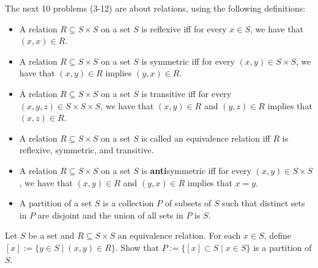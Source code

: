 \documentclass[12pt]{article}
\newenvironment{ex}[2][Problem]{\begin{trivlist}
\item[\hskip \labelsep {\bfseries #1}\hskip \labelsep {\bfseries #2.}]}{\end{trivlist}}
\begin{document}
The next 10 problems (3-12) are about relations, using the following definitions:
\begin{itemize}
    \item A relation $R\subseteq S\times S$ on a set $S$ is reflexive iff
        for every $x\in S$, we have that $(x,x)\in R$.
    \item A relation $R\subseteq S\times S$ on a set $S$ is symmetric iff
        for every $(x,y)\in S\times S$,
            we have that $(x,y)\in R$ implies $(y,x)\in R$.
    \item A relation $R\subseteq S\times S$ on a set $S$ is transitive iff
        for every $(x,y,z)\in S\times S\times S$, we have that
            $(x,y)\in R$ and $(y,z)\in R$ implies that $(x,z)\in R$.
    \item A relation $R\subseteq S\times S$ on a set $S$ is called an
        equivalence relation iff $R$ is reflexive, symmetric, and transitive.
    \item A relation $R\subseteq S\times S$ on a set $S$ is \textbf{anti}symmetric
        iff for every $(x,y)\in S\times S$, we have that
            $(x,y)\in R$ and $(y,x)\in R$ implies that $x = y$.
    \item A partition of a set $S$ is a collection $P$ of subsets of $S$ such that
        distinct sets in $P$ are disjoint and the union of all sets in $P$ is $S$.

\end{itemize}

\begin{ex}{3} [Equiv defines a partition]
    Let $S$ be a set and $R\subseteq S\times S$ an equivalence relation. For
    each $x\in S$, define $[x] := \{y\in S \;|\; (x,y)\in R\}$.
    Show that $P := \{[x]\subset S \;|\; x \in S \}$ is a partition of $S$.
\end{ex}
\end{document}
